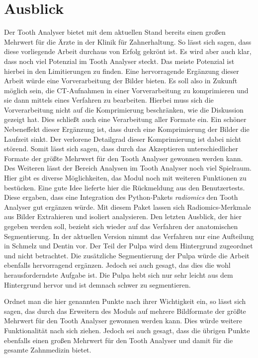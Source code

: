 \chapter{Ausblick}
\label{chap:schlussfolgerung} Der Tooth Analyser bietet mit dem aktuellen Stand bereits
einen großen Mehrwert für die Ärzte in der Klinik für Zahnerhaltung. So lässt
sich sagen, dass diese vorliegende Arbeit durchaus von Erfolg gekrönt ist. Es
wird aber auch klar, dass noch viel Potenzial im Tooth Analyser steckt. Das
meiste Potenzial ist hierbei in den Limitierungen zu finden. Eine hervorragende Ergänzung
dieser Arbeit würde eine Vorverarbeitung der Bilder bieten. Es soll also in
Zukunft möglich sein, die \ac{CT}-Aufnahmen in einer Vorverarbeitung zu
komprimieren und sie dann mittels eines Verfahren zu bearbeiten. Hierbei muss sich
die Vorverarbeitung nicht auf die Komprimierung beschränken, wie die Diskussion
gezeigt hat. Dies schließt auch eine Verarbeitung aller Formate ein. Ein schöner
Nebeneffekt dieser Ergänzung ist, dass durch eine Komprimierung der Bilder die Laufzeit
sinkt. Der verlorene Detailgrad dieser Komprimierung ist dabei nicht störend. Somit
lässt sich sagen, dass durch das Akzeptieren unterschiedlicher Formate der
größte Mehrwert für den Tooth Analyser gewonnen werden kann. Des Weiteren lässt der
Bereich Analysen im Tooth Analyser noch viel Spielraum. Hier gibt es diverse
Möglichkeiten, das Modul noch mit weiteren Funktionen zu bestücken. Eine gute
Idee lieferte hier die Rückmeldung aus den Benutzertests. Diese ergaben, dass
eine Integration des Python-Pakets \textit{radiomics} den Tooth Analyser gut ergänzen
würde. Mit diesem Paket lassen sich Radiomics-Merkmale aus Bilder Extrahieren
und isoliert analysieren. Den letzten Ausblick, der hier gegeben werden soll, bezieht
sich wieder auf das Verfahren der anatomischen Segmentierung. In der aktuellen
Version nimmt das Verfahren nur eine Aufteilung in Schmelz und Dentin vor. Der Teil
der Pulpa wird dem Hintergrund zugeordnet und nicht betrachtet. Die zusätzliche
Segmentierung der Pulpa würde die Arbeit ebenfalls hervorragend ergänzen. Jedoch
sei auch gesagt, das dies die wohl herausforderndste Aufgabe ist. Die Pulpa hebt
sich nur sehr leicht aus dem Hintergrund hervor und ist demnach schwer zu segmentieren.

Ordnet man die hier genannten Punkte nach ihrer Wichtigkeit ein, so lässt sich
sagen, das durch das Erweitern des Moduls auf mehrere Bildformate der größte Mehrwert
für den Tooth Analyser gewonnen werden kann. Dies würde weitere Funktionalität
nach sich ziehen. Jedoch sei auch gesagt, dass die übrigen Punkte ebenfalls
einen großen Mehrwert für den Tooth Analyser und damit für die gesamte
Zahnmedizin bietet.
